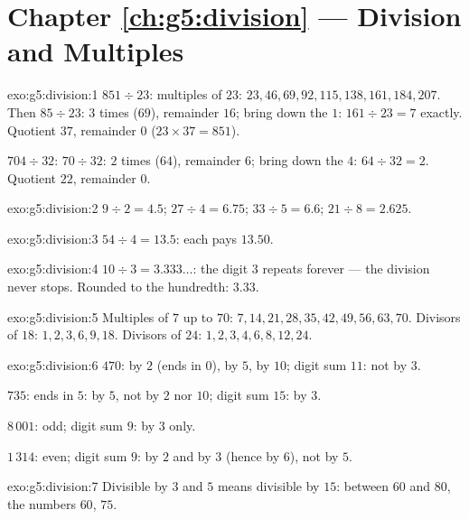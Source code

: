 \section*{Chapter \ref{ch:g5:division} --- Division and Multiples}

\begin{solution}{exo:g5:division:1}
$851 \div 23$: multiples of $23$: $23, 46, 69, 92, 115, 138, 161,
184, 207$. Then $85 \div 23$: $3$ times ($69$), remainder $16$;
bring down the $1$: $161 \div 23 = 7$ exactly. Quotient $37$,
remainder $0$ ($23 \times 37 = 851$).

$704 \div 32$: $70 \div 32$: $2$ times ($64$), remainder $6$; bring
down the $4$: $64 \div 32 = 2$. Quotient $22$, remainder $0$.
\end{solution}

\begin{solution}{exo:g5:division:2}
$9 \div 2 = 4.5$; \quad $27 \div 4 = 6.75$; \quad
$33 \div 5 = 6.6$; \quad $21 \div 8 = 2.625$.
\end{solution}

\begin{solution}{exo:g5:division:3}
$54 \div 4 = 13.5$: each pays $13.50$.
\end{solution}

\begin{solution}{exo:g5:division:4}
$10 \div 3 = 3.333\dots$: the digit $3$ repeats forever --- the
division never stops. Rounded to the hundredth: $3.33$.
\end{solution}

\begin{solution}{exo:g5:division:5}
Multiples of $7$ up to $70$: $7, 14, 21, 28, 35, 42, 49, 56, 63,
70$. Divisors of $18$: $1, 2, 3, 6, 9, 18$. Divisors of $24$:
$1, 2, 3, 4, 6, 8, 12, 24$.
\end{solution}

\begin{solution}{exo:g5:division:6}
$470$: by $2$ (ends in $0$), by $5$, by $10$; digit sum $11$: not by
$3$.

$735$: ends in $5$: by $5$, not by $2$ nor $10$; digit sum $15$: by
$3$.

$8\,001$: odd; digit sum $9$: by $3$ only.

$1\,314$: even; digit sum $9$: by $2$ and by $3$ (hence by $6$),
not by $5$.
\end{solution}

\begin{solution}{exo:g5:division:7}
Divisible by $3$ and $5$ means divisible by $15$: between $60$ and
$80$, the numbers $60$, $75$.
\end{solution}

